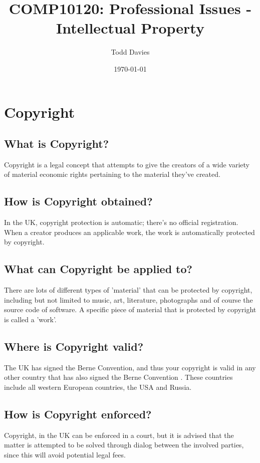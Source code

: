\documentclass{article}
\author{Todd Davies}
\title{COMP10120: Professional Issues - Intellectual Property}
\date{\today}
\begin{document}
\lhead{\today}

\maketitle

\section{Copyright}

\subsection{What is Copyright?}
Copyright is a legal concept that attempts to give the creators of a wide variety of material economic rights pertaining to the material they've created. \cite{govukwhatis}

\subsection{How is Copyright obtained?}
In the UK, copyright protection is automatic; there's no official registration. When a creator produces an applicable work, the work is automatically protected by copyright. \cite{govukautoprotect}

\subsection{What can Copyright be applied to?}
There are lots of different types of 'material' that can be protected by copyright, including but not limited to music, art, literature, photographs and of course the source code of software. A specific piece of material that is protected by copyright is called a 'work'.

\subsection{Where is Copyright valid?}
The UK has signed the Berne Convention, and thus your copyright is valid in any other country that has also signed the Berne Convention \cite{berneconvention}. These countries include all western European countries, the USA and Russia. \cite{govukabroad}

\subsection{How is Copyright enforced?}
Copyright, in the UK can be enforced in a court, but it is advised that the matter is attempted to be solved through dialog between the involved parties, since this will avoid potential legal fees. \cite{govukenforce}
\end{document}
